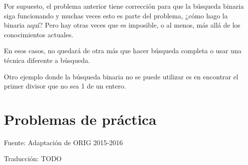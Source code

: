 Por supuesto, el problema anterior tiene corrección para que la búsqueda binaria siga funcionando y muchas veces esto es parte del problema, ¿cómo hago la binaria aquí? Pero hay otras veces que es imposible, o al menos, más allá de los conocimientos actuales.

En esos casos, no quedará de otra más que hacer búsqueda completa o usar una técnica diferente a búsqueda.

Otro ejemplo donde la búsqueda binaria no se puede utilizar es en encontrar el primer divisor que no sea 1 de un entero.

\section*{Problemas de práctica}

\begin{exercise}
\end{exercise}

\begin{exercise}
	Fuente: Adaptación de ORIG 2015-2016
\end{exercise}

\begin{exercise}
	Traducción: TODO
\end{exercise}

